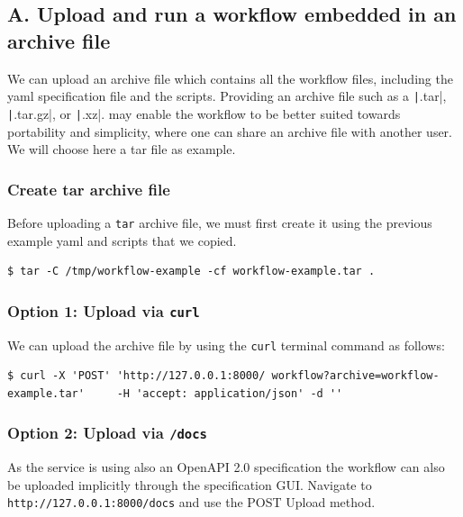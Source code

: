 \subsection{A. Upload and run a workflow embedded in an archive
file}\label{a.-upload-and-run-a-workflow-embedded-in-an-archive-file}

We can upload an archive file which contains all the workflow files,
including the yaml specification file and the scripts. Providing an
archive file such as a \texttt|.tar|, \texttt|.tar.gz|, or \texttt|.xz|.
may enable the workflow to be better suited towards portability and
simplicity, where one can share an archive file with another user. We
will choose here a tar file as example.

\subsubsection{Create tar archive file}\label{create-tar-archive-file}

Before uploading a \texttt{tar} archive file, we must first create it
using the previous example yaml and scripts that we copied.

\smallskip
\begin{verbatim}
$ tar -C /tmp/workflow-example -cf workflow-example.tar .
\end{verbatim}
\smallskip

\subsubsection{\texorpdfstring{Option 1: Upload via
\texttt{curl}}{Option 1: Upload via curl}}\label{option-1-upload-via-curl}

We can upload the archive file by using the \texttt{curl} terminal
command as follows:

\smallskip
\begin{verbatim}
$ curl -X 'POST' 'http://127.0.0.1:8000/ workflow?archive=workflow-example.tar'     -H 'accept: application/json' -d ''
\end{verbatim}
\smallskip

\subsubsection{\texorpdfstring{Option 2: Upload via
\texttt{/docs}}{Option 2: Upload via /docs}}\label{option-2-upload-via-docs}

As the service is using also an OpenAPI 2.0 specification the workflow
can also be uploaded implicitly through the specification GUI. Navigate
to \texttt{http://127.0.0.1:8000/docs} and use the POST Upload method.

